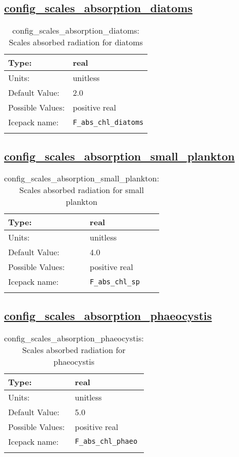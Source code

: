 \subsection[config\_scales\_absorption\_diatoms]{\hyperref[sec:nm_tab_biogeochemistry]{config\_scales\_absorption\_diatoms}}
\label{subsec:nm_sec_config_scales_absorption_diatoms}
\begin{center}
\begin{longtable}{| p{2.0in} || p{4.0in} |}
    \hline
    Type: & real \\
    \hline
    Units: & \si{unitless} \\
    \hline
    Default Value: & 2.0 \\
    \hline
    Possible Values: & positive real \\
    \hline
    \hline
    Icepack name: & \verb+F_abs_chl_diatoms+ \\
    \caption{config\_scales\_absorption\_diatoms: Scales absorbed radiation for diatoms}
\end{longtable}
\end{center}
\subsection[config\_scales\_absorption\_small\_plankton]{\hyperref[sec:nm_tab_biogeochemistry]{config\_scales\_absorption\_small\_plankton}}
\label{subsec:nm_sec_config_scales_absorption_small_plankton}
\begin{center}
\begin{longtable}{| p{2.0in} || p{4.0in} |}
    \hline
    Type: & real \\
    \hline
    Units: & \si{unitless} \\
    \hline
    Default Value: & 4.0 \\
    \hline
    Possible Values: & positive real \\
    \hline
    \hline
    Icepack name: & \verb+F_abs_chl_sp+ \\
    \caption{config\_scales\_absorption\_small\_plankton: Scales absorbed radiation for small plankton}
\end{longtable}
\end{center}
\subsection[config\_scales\_absorption\_phaeocystis]{\hyperref[sec:nm_tab_biogeochemistry]{config\_scales\_absorption\_phaeocystis}}
\label{subsec:nm_sec_config_scales_absorption_phaeocystis}
\begin{center}
\begin{longtable}{| p{2.0in} || p{4.0in} |}
    \hline
    Type: & real \\
    \hline
    Units: & \si{unitless} \\
    \hline
    Default Value: & 5.0 \\
    \hline
    Possible Values: & positive real \\
    \hline
    \hline
    Icepack name: & \verb+F_abs_chl_phaeo+ \\
    \caption{config\_scales\_absorption\_phaeocystis: Scales absorbed radiation for phaeocystis}
\end{longtable}
\end{center}
